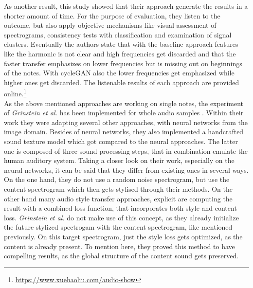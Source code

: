 As another result, this study showed that their approach generate the results in a shorter amount of time. For the purpose of evaluation, they listen to the outcome, but also apply objective mechanisms like visual assessment of spectrograms, consistency tests with classification and examination of signal clusters. Eventually the authors state that with the baseline approach features like the harmonic is not clear and high frequencies get discarded and that the faster transfer emphasizes on lower frequencies but is missing out on beginnings of the notes. With cycleGAN also the lower frequencies get emphasized while higher ones get discarded. The listenable results of each approach are provided online.\footnote{\url{https://www.xuehaoliu.com/audio-show}}\\

As the above mentioned approaches are working on single notes, the experiment of \textit{Grinstein et al.} has been implemented for whole audio samples \cite{Grinstein2018}. Within their work they were adapting several other approaches, with neural networks from the image domain. Besides of neural networks, they also implemented a handcrafted sound texture model which got compared to the neural approaches. The latter one is composed of three sound processing steps, that in combination emulate the human auditory system. Taking a closer look on their work, especially on the neural networks, it can be said that they differ from existing ones in several ways. On the one hand, they do not use a random noise spectrogram, but use the content spectrogram which then gets stylised through their methods. On the other hand many audio style transfer approaches, explicit are computing the result with a combined loss function, that incorporates both style and content loss. \textit{Grinstein et al.} do not make use of this concept, as they already initialize the future stylized spectrogam with the content spectrogram, like mentioned previously. On this target spectrogram, just the style loss gets optimized, as the content is already present. To mention here, they proved this method to have compelling results, as the global structure of the content sound gets preserved.\\
